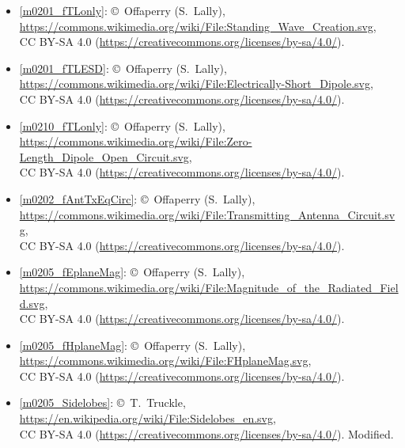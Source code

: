 \begin{itemize}

\item[Fig.] \label{m0201_fTLonly_Credit}
  \ref{m0201_fTLonly}:
  \copyright~Offaperry (S.\ Lally), 
  \url{https://commons.wikimedia.org/wiki/File:Standing_Wave_Creation.svg},\\ 
  CC BY-SA 4.0 (\url{https://creativecommons.org/licenses/by-sa/4.0/}).

\item[Fig.] \label{m0201_fTLESD_Credit}
  \ref{m0201_fTLESD}:
  \copyright~Offaperry (S.\ Lally), 
  \url{https://commons.wikimedia.org/wiki/File:Electrically-Short_Dipole.svg},\\ 
  CC BY-SA 4.0 (\url{https://creativecommons.org/licenses/by-sa/4.0/}).

\item[Fig.] \label{m0210_fTLonly_Credit}
  \ref{m0210_fTLonly}:
  \copyright~Offaperry (S.\ Lally), 
  \url{https://commons.wikimedia.org/wiki/File:Zero-Length_Dipole_Open_Circuit.svg},\\ 
  CC BY-SA 4.0 (\url{https://creativecommons.org/licenses/by-sa/4.0/}).

\item[Fig.] \label{m0202_fAntTxEqCirc_Credit}
  \ref{m0202_fAntTxEqCirc}:
  \copyright~Offaperry (S.\ Lally), 
  \url{https://commons.wikimedia.org/wiki/File:Transmitting_Antenna_Circuit.svg},\\ 
  CC BY-SA 4.0 (\url{https://creativecommons.org/licenses/by-sa/4.0/}).

\item[Fig.] \label{m0205_fEplaneMag_Credit}
  \ref{m0205_fEplaneMag}:
  \copyright~Offaperry (S.\ Lally), 
  \url{https://commons.wikimedia.org/wiki/File:Magnitude_of_the_Radiated_Field.svg},\\ 
  CC BY-SA 4.0 (\url{https://creativecommons.org/licenses/by-sa/4.0/}).

\item[Fig.] \label{m0205_fHplaneMag_Credit}
  \ref{m0205_fHplaneMag}:
  \copyright~Offaperry (S.\ Lally), 
  \url{https://commons.wikimedia.org/wiki/File:FHplaneMag.svg},\\ 
  CC BY-SA 4.0 (\url{https://creativecommons.org/licenses/by-sa/4.0/}).

\item[Fig.] \label{m0205_Sidelobes_Credit}
  \ref{m0205_Sidelobes}:
  \copyright~T.\ Truckle, 
  \url{https://en.wikipedia.org/wiki/File:Sidelobes_en.svg},\\ 
  CC BY-SA 4.0 (\url{https://creativecommons.org/licenses/by-sa/4.0/}).
  Modified.


\end{itemize}
